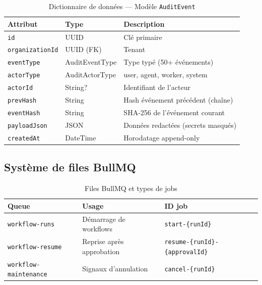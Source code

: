 \begin{table}[H]
\centering
\caption{Dictionnaire de données — Modèle \texttt{AuditEvent}}
\label{tab:dico_audit}
\small
\begin{tabularx}{\textwidth}{@{}p{3.6cm}p{2.8cm}X@{}}
\toprule
\textbf{Attribut} & \textbf{Type} & \textbf{Description} \\
\midrule
\texttt{id} & UUID & Clé primaire \\
\rowcolor{rowgray}
\texttt{organizationId} & UUID (FK) & Tenant \\
\texttt{eventType} & AuditEventType & Type typé (50+ événements) \\
\rowcolor{rowgray}
\texttt{actorType} & AuditActorType & user, agent, worker, system \\
\texttt{actorId} & String? & Identifiant de l'acteur \\
\rowcolor{rowgray}
\texttt{prevHash} & String & Hash événement précédent (chaîne) \\
\texttt{eventHash} & String & SHA-256 de l'événement courant \\
\rowcolor{rowgray}
\texttt{payloadJson} & JSON & Données redactées (secrets masqués) \\
\texttt{createdAt} & DateTime & Horodatage append-only \\
\bottomrule
\end{tabularx}
\end{table}

\subsection{Système de files BullMQ}

\begin{table}[H]
\centering
\caption{Files BullMQ et types de jobs}
\label{tab:queues}
\begin{tabularx}{\textwidth}{@{}p{3.2cm}Xp{3.2cm}@{}}
\toprule
\textbf{Queue} & \textbf{Usage} & \textbf{ID job} \\
\midrule
\rowcolor{rowgray}
\texttt{workflow-runs} & Démarrage de workflows &
  \texttt{start-\{runId\}} \\
\texttt{workflow-resume} & Reprise après approbation &
  \texttt{resume-\{runId\}-\{approvalId\}} \\
\rowcolor{rowgray}
\texttt{workflow-maintenance} & Signaux d'annulation &
  \texttt{cancel-\{runId\}} \\
\bottomrule
\end{tabularx}
\end{table}

